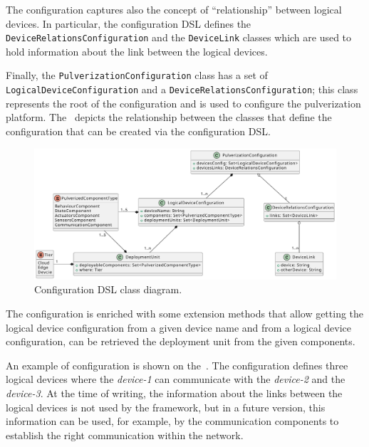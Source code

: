 The configuration captures also the concept of ``relationship'' between logical devices. In particular, the configuration DSL defines
the \texttt{Device\-Relations\-Configuration} and the \texttt{DeviceLink} classes which are used to hold information about the link between the logical devices.

Finally, the \texttt{PulverizationConfiguration} class has a set of \texttt{Logical\-Device\-Configuration} and a
\texttt{DeviceRelationsConfiguration}; this class represents the root of the configuration and is used to configure the pulverization platform.
The~ depicts the relationship between the classes that define the configuration that can be created via the 
configuration DSL.

\begin{figure}
	\centering
	\includegraphics[width=\textwidth]{figures/config-dsl-class.pdf}
	\caption{Configuration DSL class diagram.}
	\label{fig:configuration-dsl-classes}
\end{figure}

The configuration is enriched with some extension methods that allow getting the logical device configuration from a given device name and
from a logical device configuration, can be retrieved the deployment unit from the given components.

An example of configuration is shown on the~. The configuration defines three logical devices where the
\emph{device-1} can communicate with the \emph{device-2} and the \emph{device-3}. At the time of writing, the information about the links
between the logical devices is not used by the framework, but in a future version, this information can be used, for example, by the communication
components to establish the right communication within the network.



